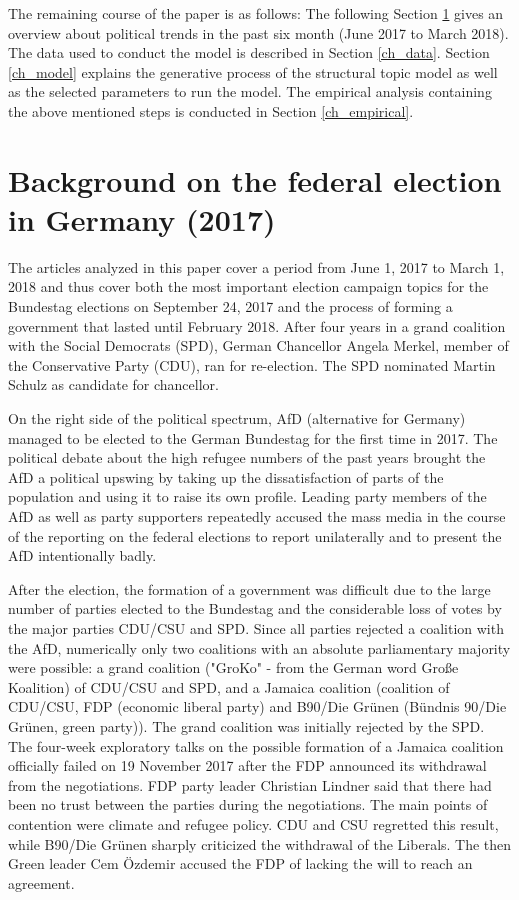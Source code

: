 \documentclass[12pt,a4paper,notitlepage]{article}
\begin{document}
The remaining course of the paper is as follows: The following Section \ref{ch_elections} gives an overview about political trends in the past six month (June 2017 to March 2018). The data used to conduct the model is described in Section \ref{ch_data}. Section \ref{ch_model} explains the generative process of the structural topic model as well as the selected parameters to run the model. The empirical analysis containing the above mentioned steps is conducted in Section \ref{ch_empirical}. 
 
\section{Background on the federal election in Germany (2017)}\label{ch_elections}

The articles analyzed in this paper cover a period from June 1, 2017 to March 1, 2018 and thus cover both the most important election campaign topics for the Bundestag elections on September 24, 2017 and the process of forming a government that lasted until February 2018. After four years in a grand coalition with the Social Democrats (SPD), German Chancellor Angela Merkel, member of the Conservative Party (CDU), ran for re-election. The SPD nominated Martin Schulz as candidate for chancellor. 

On the right side of the political spectrum, AfD (alternative for Germany) managed to be elected to the German Bundestag for the first time in 2017. The political debate about the high refugee numbers of the past years brought the AfD a political upswing by taking up the dissatisfaction of parts of the population and using it to raise its own profile. Leading party members of the AfD as well as party supporters repeatedly accused the mass media in the course of the reporting on the federal elections to report unilaterally and to present the AfD intentionally badly.

After the election, the formation of a government was difficult due to the large number of parties elected to the Bundestag and the considerable loss of votes by the major parties CDU/CSU and SPD. Since all parties rejected a coalition with the AfD, numerically only two coalitions with an absolute parliamentary majority were possible: a grand coalition ("GroKo" - from the German word Große Koalition) of CDU/CSU and SPD, and a Jamaica coalition (coalition of CDU/CSU, FDP (economic liberal party) and B90/Die Grünen (Bündnis 90/Die Grünen, green party)). The grand coalition was initially rejected by the SPD. The four-week exploratory talks on the possible formation of a Jamaica coalition officially failed on 19 November 2017 after the FDP announced its withdrawal from the negotiations. FDP party leader Christian Lindner said that there had been no trust between the parties during the negotiations. The main points of contention were climate and refugee policy. CDU and CSU regretted this result, while B90/Die Grünen sharply criticized the withdrawal of the Liberals. The then Green leader Cem Özdemir accused the FDP of lacking the will to reach an agreement.
\end{document}
